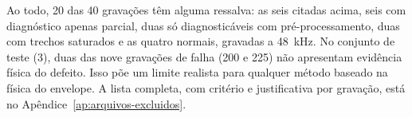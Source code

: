 Ao todo, 20 das 40 gravações têm alguma ressalva: as seis citadas acima, seis com diagnóstico apenas parcial, duas só diagnosticáveis com pré-processamento, duas com trechos saturados e as quatro normais, gravadas a \SI{48}{\kilo\hertz}. No conjunto de teste (\SI{3}{\hp}), duas das nove gravações de falha (200 e 225) não apresentam evidência física do defeito. Isso põe um limite realista para qualquer método baseado na física do envelope. A lista completa, com critério e justificativa por gravação, está no Apêndice~\ref{ap:arquivos-excluidos}.
